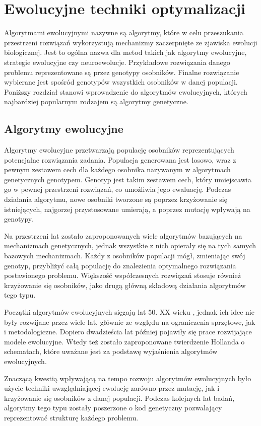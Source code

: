 \chapter{Ewolucyjne techniki optymalizacji}
\label{cha:genetyczne}
Algorytmami ewolucyjnymi nazywne są algorytmy, które w celu przeszukania przestrzeni rozwiązań  wykorzystują mechanizmy zaczerpnięte ze zjawiska ewolucji biologicznej. Jest to ogólna nazwa dla metod takich jak algorytmy ewolucyjne, strategie ewolucyjne czy neuroewolucje. Przykładowe rozwiązania danego problemu reprezentowane są przez genotypy osobników. Finalne rozwiązanie wybierane jest spośród genotypów wszystkich osobników w danej populacji. Poniższy rozdział stanowi wprowadzenie do algorytmów ewolucyjnych, których najbardziej popularnym rodzajem są algorytmy genetyczne. 

\section{Algorytmy ewolucyjne}
\label{sec:historiagenetycznych}
Algorytmy ewolucyjne przetwarzają populację osobników reprezentujących potencjalne rozwiązania zadania. Populacja generowana jest losowo, wraz z pewnym zestawem cech dla każdego osobnika nazywanym w algorytmach genetycznych genotypem. Genotyp jest takim zestawem cech, który umiejscawia go w pewnej przestrzeni rozwiązań, co umożliwia jego ewaluację. Podczas działania algorytmu, nowe osobniki tworzone są poprzez krzyżowanie się istniejących, najgorzej przystosowane umierają, a poprzez mutację wpływają na genotypy.  

Na przestrzeni lat zostało zaproponowanych wiele algorytmów bazujących na mechanizmach genetycznych, jednak wszystkie z nich opierały się na tych samych bazowych mechanizmach. Każdy z osobników populacji mógł, zmieniając swój genotyp, przybliżyć całą populację do znalezienia optymalnego rozwiązania postawionego problemu. Większość współczesnych rozwiązań stosuje również krzyżowanie się osobników, jako drugą główną składową działania algorytmów tego typu.

Początki algorytmów ewolucyjnych sięgają lat 50. XX wieku \cite{GA1}, jednak ich idee nie były rozwijane przez wiele lat, głównie ze względu na ograniczenia sprzętowe, jak i metodologiczne. Dopiero dwadzieścia lat później \cite{GA2} pojawiły się prace rozwijające modele ewolucyjne. Wtedy też zostało zaproponowane twierdzenie Hollanda o schematach, które uważane jest za podstawę wyjaśnienia algorytmów ewolucyjnych. 

Znaczącą kwestią wpływającą na tempo rozwoju algorytmów ewolucyjnych było użycie techniki uwzględniającej ewolucję zarówno przez mutację, jak i krzyżowanie się osobników z danej populacji. Podczas kolejnych lat badań, algorytmy tego typu zostały poszerzone o kod genetyczny pozwalający reprezentować strukturę każdego problemu.



